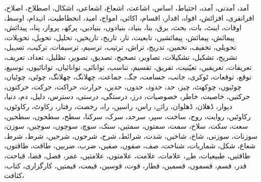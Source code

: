                          آمد،            آمدنی،            آمدہ،            احتیاط،            اساس،            اشاعت،            اشعاع،            اشعاعی،            اشکال،            اصطلاح،            اصلاح،            افراتفری،            افزائش،            افواہ،            اقدار،            اقسام،            اکائی،            امواج،            امید،            انحطاطیت،            انہدام،            اوسط،            اوقات،            اینٹ،            بات،            بحث،            برق،            بنا،            بنیاد،            بنیادوں،            بنیادیں،            پرکھ،            پرواز،            پناہ،            پیدائش،            پیمائش،            پیمائش،            پیمائشیں،            تابعیت،            تار،            تاریخ،            تاریخیں،            تحلیل،            تحویل،            تحویلات،            تحویلی،            تخفیف،            تخمین،            تدریج،            تراش،            ترتیب،            ترسیم،            ترسیمات،            ترکیب،            تسہیل،            تشریح،            تشکیل،            تشکیلات،            تصاویر،            تصحیح،            تصدیق،            تصویر،            تظلیل،            تعداد،            تعریف،            تعریفات،            تعریفیں،            تعیّنیت،            تفریق،            تقسیم،            تناسب،            توانائی،            توانائیاں،            توانائیوں،            توسیع،            توقع،            توقعات،            ٹوکری،            جانب،            جسامت،            جگہ،            جماعت،            چھلانگ،            چھلانگ،            چوٹی،            چوٹیاں،            چوٹیوں،            چوکھٹ،            چیز،            حد،            حدود،            حدوں،            حدیں،            حرارت،            حراکت،            حرکت،            حرکتوں،            حرکتیں،            خاصیت،            خاطر،            خصوصیات،            درز،            درستگی،            درستی،            دسترس،            دلیل،            دم،            دنیا،            دیوار،            ڈھلان،            ڈھلوان،            رائے،            راس،            راسیں،            راہ،            رخصت،            رفتار،            رکاوٹ،            رکاوٹوں،            رکاوٹیں،            روایت،            روح،            ساخت،            سپر،            سرحد،            سرک،            سرکنا،            سطح،            سطحوں،            سطحیں،            سعت،            سکت،            سلاخ،            سمت،            سمتوں،            سمتیں،            سنک،            سوچ،            سوچوں،            سوچیں،            سوزن،            سوزنات،            سوزنی،            شاخ،            شاخیں،            شدت،            شرائط،            شرح،            شرحوں،            شرحیں،            شرط،            شرط،            شعاع،            شکل،            شماریات،            شناخت،            صف،            صفوں،            صفیں،            ضرب،            ضربیں،            طاقت،            طاقتوں،            طاقتیں،            طبیعیات،            طے،            علامات،            علامت،            علامتوں،            علامتیں،            عمر،            فصل،            فضا،            قباحت،            قدر،            قسم،            قسموں،            قسمیں،            قطار،            قوت،            قوسین،            قیمت،            قیمتیں،            کارگزاری،            کتاب،            کثافت،     
